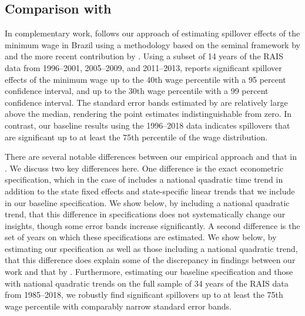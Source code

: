 \clearpage
\subsection{Comparison with \citet{Haanwinckel2020_appendix}\label{app_subsec:lee_regressions_haanwinckel}}

In complementary work,  follows our approach of estimating spillover effects of the minimum wage in Brazil using a methodology based on the seminal framework by  and the more recent contribution by . Using a subset of 14 years of the RAIS data from 1996--2001, 2005--2009, and 2011--2013,  reports significant spillover effects of the minimum wage up to the 40th wage percentile with a 95 percent confidence interval, and up to the 30th wage percentile with a 99 percent confidence interval. The standard error bands estimated by  are relatively large above the median, rendering the point estimates indistinguishable from zero. In contrast, our baseline results using the 1996--2018 data indicates spillovers that are significant up to at least the 75th percentile of the wage distribution.

There are several notable differences between our empirical approach and that in . We discuss two key differences here. One difference is the exact econometric specification, which in the case of  includes a national quadratic time trend in addition to the state fixed effects and state-specific linear trends that we include in our baseline specification. We show below, by including a national quadratic trend, that this difference in specifications does not systematically change our insights, though some error bands increase significantly. A second difference is the set of years on which these specifications are estimated. We show below, by estimating our specification as well as those including a national quadratic trend, that this difference does explain some of the discrepancy in findings between our work and that by . Furthermore, estimating our baseline specification and those with national quadratic trends on the full sample of 34 years of the RAIS data from 1985--2018, we robustly find significant spillovers up to at least the 75th wage percentile with comparably narrow standard error bands.

